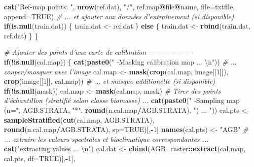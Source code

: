 \documentclass[a4paper, notitlepage, 12pt, krantz2]{krantz}
\newenvironment{Shaded}{\begin{snugshade}}{\end{snugshade}}
\newcommand{\CharTok}[1]{\textcolor[rgb]{0.31,0.60,0.02}{#1}}
\newcommand{\CommentTok}[1]{\textcolor[rgb]{0.56,0.35,0.01}{\textit{#1}}}
\newcommand{\ControlFlowTok}[1]{\textcolor[rgb]{0.13,0.29,0.53}{\textbf{#1}}}
\newcommand{\DataTypeTok}[1]{\textcolor[rgb]{0.13,0.29,0.53}{#1}}
\newcommand{\DecValTok}[1]{\textcolor[rgb]{0.00,0.00,0.81}{#1}}
\newcommand{\KeywordTok}[1]{\textcolor[rgb]{0.13,0.29,0.53}{\textbf{#1}}}
\newcommand{\NormalTok}[1]{#1}
\newcommand{\OperatorTok}[1]{\textcolor[rgb]{0.81,0.36,0.00}{\textbf{#1}}}
\newcommand{\OtherTok}[1]{\textcolor[rgb]{0.56,0.35,0.01}{#1}}
\newcommand{\StringTok}[1]{\textcolor[rgb]{0.31,0.60,0.02}{#1}}
\begin{document}
\begin{Shaded}
\begin{Highlighting}[]
    \KeywordTok{cat}\NormalTok{(}\StringTok{"Ref-map points: "}\NormalTok{, }\KeywordTok{nrow}\NormalTok{(ref.dat), }\StringTok{"/"}\NormalTok{, ref.map}\OperatorTok{@}\NormalTok{file}\OperatorTok{@}\NormalTok{name, }\DataTypeTok{file=}\NormalTok{txtfile, }\DataTypeTok{append=}\OtherTok{TRUE}\NormalTok{)}
    \CommentTok{# ... et ajouter aux données d'entraînement (si disponible)}
    \ControlFlowTok{if}\NormalTok{(}\KeywordTok{is.null}\NormalTok{(train.dat)) \{}
\NormalTok{      train.dat <-}\StringTok{ }\NormalTok{ref.dat}
\NormalTok{    \} }\ControlFlowTok{else}\NormalTok{ \{}
\NormalTok{      train.dat <-}\StringTok{ }\KeywordTok{rbind}\NormalTok{(train.dat, ref.dat)}
\NormalTok{    \}}
\NormalTok{  \}}
  
  \CommentTok{# Ajouter des points d'une carte de calibration -------------------}
  \ControlFlowTok{if}\NormalTok{(}\OperatorTok{!}\KeywordTok{is.null}\NormalTok{(cal.map)) \{}
    \KeywordTok{cat}\NormalTok{(}\KeywordTok{paste0}\NormalTok{(}\StringTok{"    -Masking calibration map ... }\CharTok{\textbackslash{}n}\StringTok{"}\NormalTok{))}
    \CommentTok{# ... couper/masquer avec l'image}
\NormalTok{    cal.map  <-}\StringTok{ }\KeywordTok{mask}\NormalTok{(}\KeywordTok{crop}\NormalTok{(cal.map, image[[}\DecValTok{1}\NormalTok{]]), }\KeywordTok{crop}\NormalTok{(image[[}\DecValTok{1}\NormalTok{]], cal.map))}
    \CommentTok{# ... et masque additionelle (si disponible)}
    \ControlFlowTok{if}\NormalTok{(}\OperatorTok{!}\KeywordTok{is.null}\NormalTok{(mask)) cal.map <-}\StringTok{ }\KeywordTok{mask}\NormalTok{(cal.map, mask)}
    \CommentTok{# Tirer des points d'échantillon (stratifié selon classe biomasse) ...}
    \KeywordTok{cat}\NormalTok{(}\KeywordTok{paste0}\NormalTok{(}\StringTok{"    -Sampling map (n="}\NormalTok{, AGB.STRATA, }\StringTok{"*"}\NormalTok{, }\KeywordTok{round}\NormalTok{(n.cal.map}\OperatorTok{/}\NormalTok{AGB.STRATA), }\StringTok{") ... "}\NormalTok{))}
\NormalTok{    cal.pts <-}\StringTok{ }\KeywordTok{sampleStratified}\NormalTok{(}\KeywordTok{cut}\NormalTok{(cal.map, AGB.STRATA), }
                                \KeywordTok{round}\NormalTok{(n.cal.map}\OperatorTok{/}\NormalTok{AGB.STRATA), }\DataTypeTok{sp=}\OtherTok{TRUE}\NormalTok{)[,}\OperatorTok{-}\DecValTok{1}\NormalTok{]}
    \KeywordTok{names}\NormalTok{(cal.pts) <-}\StringTok{ "AGB"}
    \CommentTok{# ... extraire les valeurs spectrales et bioclimatique correspondantes ...}
    \KeywordTok{cat}\NormalTok{(}\StringTok{"extracting values ... }\CharTok{\textbackslash{}n}\StringTok{"}\NormalTok{)}
\NormalTok{    cal.dat <-}\StringTok{ }\KeywordTok{cbind}\NormalTok{(}\DataTypeTok{AGB=}\NormalTok{raster}\OperatorTok{::}\KeywordTok{extract}\NormalTok{(cal.map, cal.pts, }\DataTypeTok{df=}\OtherTok{TRUE}\NormalTok{)[,}\OperatorTok{-}\DecValTok{1}\NormalTok{], }

\end{Highlighting}
\end{Shaded}
\end{document}
